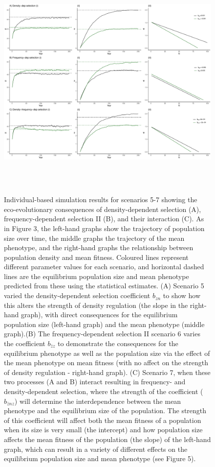 \documentclass{article}
\begin{document}
\newpage
\begin{figure} [H]
	\centering
	\includegraphics[width=12cm, height=12cm]{Figures/Fig4.pdf}
	\caption{Individual-based simulation results for scenarios 5-7 showing the eco-evolutionary consequences of density-dependent selection (A), frequency-dependent selection II (B), and their interaction (C). As in Figure 3, the left-hand graphs show the trajectory of population size over time, the middle graphs the trajectory of the mean phenotype, and the right-hand graphs the relationship between population density and mean fitness. Coloured lines represent different parameter values for each scenario, and horizontal dashed lines are the equilibrium population size and mean phenotype predicted from these using the statistical estimates. (A) Scenario 5 varied the density-dependent selection coefficient $b_{zn}$ to show how this alters the strength of density regulation (the slope in the right-hand graph), with direct consequences for the equilibrium population size (left-hand graph) and the mean phenotype (middle graph).(B) The frequency-dependent selection II scenario 6 varies the coefficient $b_{\bar{z}z}$ to demonstrate the consequences for the equilibrium phenotype as well as the population size via the effect of the mean phenotype on mean fitness (with no affect on the strength of density regulation - right-hand graph). (C) Scenario 7, when these two processes (A and B) interact resulting in frequency- and density-dependent selection, where the strength of the  coefficient ($b_{\bar{z}nz}$) will determine the interdependence between the mean phenotype and the equilibrium size of the population. The strength of this coefficient will affect both the mean fitness of a population when its size is very small (the intercept) and how population size affects the mean fitness of the population (the slope) of  the left-hand graph, which can result in a variety of different effects on the equilibrium population size and mean phenotype (see Figure 5).} 
	\label{fig:sim3}
\end{figure}
\end{document}
